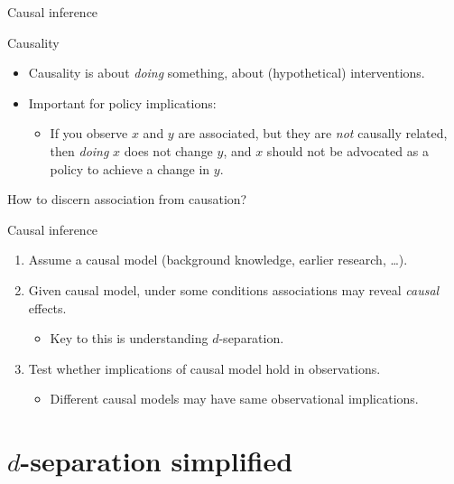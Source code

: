 \documentclass[aspectratio=169,notes=hide,compress]{beamer}
\begin{document}
\begin{frame}{Causal inference}

  \begin{block}{Causality}
    \begin{itemize}
      \item Causality is about \emph{doing} something, about (hypothetical) interventions.
      \item Important for policy implications:
        \begin{itemize}
          \item If you observe $x$ and $y$ are associated, but they are \emph{not} causally related, then \emph{doing} $x$ does not change $y$, and $x$ should not be advocated as a policy to achieve a change in $y$.
        \end{itemize}
    \end{itemize}
  \end{block}

  \pause

  How to discern association from causation?

  \pause

  \begin{block}{Causal inference}
    \begin{enumerate}
      \item<+-> Assume a causal model (background knowledge, earlier research, \ldots).
      \item<+-> Given causal model, under some conditions associations may reveal \emph{causal} effects.
      \begin{itemize}
        \item Key to this is understanding $d$-separation.
      \end{itemize}
      \item<+-> Test whether implications of causal model hold in observations.
      \begin{itemize}
        \item Different causal models may have same observational implications.
      \end{itemize}
    \end{enumerate}
  \end{block}

\end{frame}

\section{$d$-separation simplified}
\end{document}
